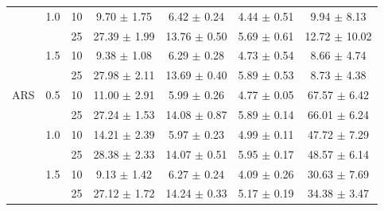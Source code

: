 \documentclass[manuscript,screen,review]{acmart}
\begin{document}
\begin{table}[ht]
{\begin{tabular}{ccccccc}
    & 1.0 & 10 &   9.70 $\pm$  1.75 &    6.42 $\pm$  0.24 &           4.44 $\pm$  0.51 &     9.94 $\pm$   8.13 \\
    &     & 25 &  27.39 $\pm$  1.99 &   13.76 $\pm$  0.50 &           5.69 $\pm$  0.61 &    12.72 $\pm$  10.02 \\
    & 1.5 & 10 &   9.38 $\pm$  1.08 &    6.29 $\pm$  0.28 &           4.73 $\pm$  0.54 &     8.66 $\pm$   4.74 \\
    &     & 25 &  27.98 $\pm$  2.11 &   13.69 $\pm$  0.40 &           5.89 $\pm$  0.53 &     8.73 $\pm$   4.38 \\
ARS & 0.5 & 10 &  11.00 $\pm$  2.91 &    5.99 $\pm$  0.26 &           4.77 $\pm$  0.05 &    67.57 $\pm$   6.42 \\
    &     & 25 &  27.24 $\pm$  1.53 &   14.08 $\pm$  0.87 &           5.89 $\pm$  0.14 &    66.01 $\pm$   6.24 \\
    & 1.0 & 10 &  14.21 $\pm$  2.39 &    5.97 $\pm$  0.23 &           4.99 $\pm$  0.11 &    47.72 $\pm$   7.29 \\
    &     & 25 &  28.38 $\pm$  2.33 &   14.07 $\pm$  0.51 &           5.95 $\pm$  0.17 &    48.57 $\pm$   6.14 \\
    & 1.5 & 10 &   9.13 $\pm$  1.42 &    6.27 $\pm$  0.24 &           4.09 $\pm$  0.26 &    30.63 $\pm$   7.69 \\
    &     & 25 &  27.12 $\pm$  1.72 &   14.24 $\pm$  0.33 &           5.17 $\pm$  0.19 &    34.38 $\pm$   3.47 \\

\end{tabular}}
\end{table}
\end{document}
